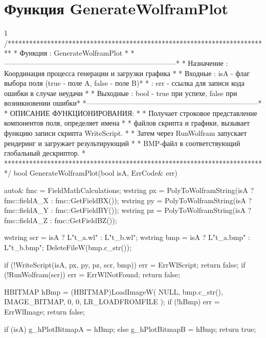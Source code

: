 \section{Функция GenerateWolframPlot}\footnotesize
\begin{listing}{1}
/*************************************************************************
* Функция        : GenerateWolframPlot                                   *
*------------------------------------------------------------------------*
* Назначение     : Координация процесса генерации и загрузки графика     *
* Входные        : isA - флаг выбора поля (true - поле A, false - поле B)*
*                : err - ссылка для записи кода ошибки в случае неудачи  *
* Выходные       : bool - true при успехе, false при возникновении ошибки*
*------------------------------------------------------------------------*
* ОПИСАНИЕ ФУНКЦИОНИРОВАНИЯ:                                             *
* Получает строковое представление компонентов поля, определяет имена    *
* файлов скрипта и графики, вызывает функцию записи скрипта WriteScript. *
* Затем через RunWolfram запускает рендеринг и загружает результирующий  *
* BMP-файл в соответствующий глобальный дескриптор.                      *
*************************************************************************/
bool GenerateWolframPlot(bool isA, ErrCode& err) {
    auto& fmc = FieldMathCalculations;
    wstring px = PolyToWolframString(isA ? fmc::fieldA_X : fmc::GetFieldBX());
    wstring py = PolyToWolframString(isA ? fmc::fieldA_Y : fmc::GetFieldBY());
    wstring pz = PolyToWolframString(isA ? fmc::fieldA_Z : fmc::GetFieldBZ());
    
    wstring scr = isA ? L"t_a.wl" : L"t_b.wl";
    wstring bmp = isA ? L"t_a.bmp" : L"t_b.bmp";
    DeleteFileW(bmp.c_str());
    
    if (!WriteScript(isA, px, py, pz, scr, bmp)) {
        err = ErrWlScript;
        return false;
    }
    if (!RunWolfram(scr)) {
        err = ErrWlNotFound;
        return false;
    }
    
    HBITMAP hBmp = (HBITMAP)LoadImageW(
        NULL, bmp.c_str(), IMAGE_BITMAP, 0, 0, LR_LOADFROMFILE
    );
    if (!hBmp) {
        err = ErrWlImage;
        return false;
    }
    
    if (isA) g_hPlotBitmapA = hBmp; else g_hPlotBitmapB = hBmp;
    return true;
}
\end{listing}
\normalsize

\pagebreak

